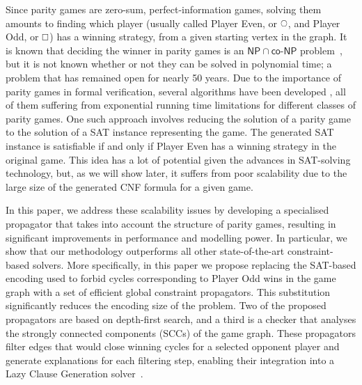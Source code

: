 \documentclass[letterpaper]{article} %
\begin{document}
Since parity games are zero-sum, perfect-information games, solving them amounts to finding which player (usually called Player Even, or $\even$, and Player Odd, or $\odd$) has a winning strategy, from a given starting vertex in the graph. 
It is known that deciding the winner in parity games is an $\mathsf{NP} \cap \mathsf{co\textit{-}NP}$ problem~\cite{Jurdziński:1998}, but it is not known whether or not they can be solved in polynomial time; a problem that has remained open for nearly 50 years. 
Due to the importance of parity games in formal verification, several algorithms have been developed \cite{Aggarwal:2023,Benerecetti:2025,Jurdziński:2000,Jurdziński:2022,Zielonka:1998}, all of them suffering from exponential running time limitations for different classes of parity games. 
One such approach involves reducing the solution of a parity game to the solution of a SAT instance representing the game. The generated SAT instance is satisfiable if and only if Player Even has a winning strategy in the original game. 
This idea has a lot of potential given the advances in SAT-solving technology, but, as we will show later, it suffers from poor scalability due to the large size of the generated CNF formula for a given game.

In this paper, we address these scalability issues by developing a specialised propagator that takes into account the structure of parity games, resulting in significant improvements in performance and modelling power. 
In particular, we show that our methodology outperforms all other state-of-the-art constraint-based solvers.
%
More specifically, in this paper we propose replacing the SAT-based encoding used to forbid cycles corresponding to Player Odd wins in the game graph \cite{Heljanko:2012} with a set of efficient global constraint propagators. This substitution significantly reduces the encoding size of the problem. Two of the proposed propagators are based on depth-first search, and a third is a checker that analyses the strongly connected components (SCCs) of the game graph. These propagators filter edges that would close winning cycles for a selected opponent player and generate explanations for each filtering step, enabling their integration into a Lazy Clause Generation solver~\cite{DBLP:journals/constraints/OhrimenkoSC09}.
\end{document}
